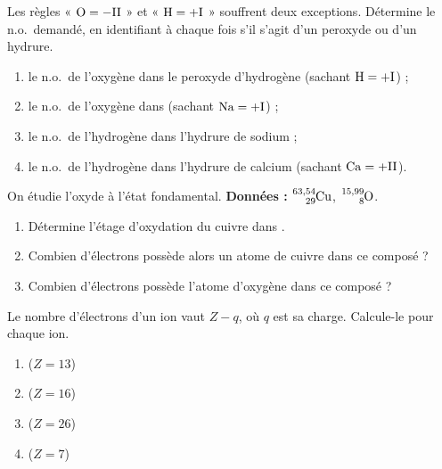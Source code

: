 \documentclass[11pt,a4paper]{article}
\begin{document}
\begin{exo}
Les règles « $\ce{O}=-\mathrm{II}$ » et « $\ce{H}=+\mathrm{I}$ » souffrent deux exceptions. Détermine le
n.o.\ demandé, en identifiant à chaque fois s'il s'agit d'un peroxyde ou d'un hydrure.
\begin{enumerate}[label=\alph*)]
  \item le n.o.\ de l'oxygène dans le peroxyde d'hydrogène  (sachant $\ce{H}=+\mathrm{I}$) ;
  \item le n.o.\ de l'oxygène dans  (sachant $\ce{Na}=+\mathrm{I}$) ;
  \item le n.o.\ de l'hydrogène dans l'hydrure de sodium  ;
  \item le n.o.\ de l'hydrogène dans l'hydrure de calcium  (sachant $\ce{Ca}=+\mathrm{II}$).
\end{enumerate}
\end{exo}

\begin{exo}
On étudie l'oxyde  à l'état fondamental. \textbf{Données :} $\ce{^{63,54}_{29}Cu}$,
$\ce{^{15,99}_{8}O}$.
\begin{enumerate}[label=\alph*)]
  \item Détermine l'étage d'oxydation du cuivre dans .
  \item Combien d'électrons possède alors un atome de cuivre dans ce composé ?
  \item Combien d'électrons possède l'atome d'oxygène dans ce composé ?
\end{enumerate}
\end{exo}

\begin{exo}
Le nombre d'électrons d'un ion vaut $Z - q$, où $q$ est sa charge. Calcule-le pour chaque ion.
\begin{enumerate}[label=\alph*)]
  \item {} ($Z=13$)
  \item {} ($Z=16$)
  \item {} ($Z=26$)
  \item {} ($Z=7$)
\end{enumerate}
\end{exo}
\end{document}

